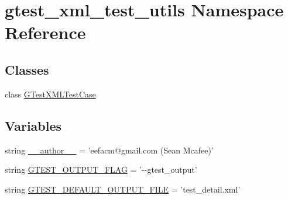 \hypertarget{namespacegtest__xml__test__utils}{\section{gtest\-\_\-xml\-\_\-test\-\_\-utils Namespace Reference}
\label{namespacegtest__xml__test__utils}
}
\subsection*{Classes}
\begin{DoxyCompactItemize}
\item 
class \hyperlink{classgtest__xml__test__utils_1_1_g_test_x_m_l_test_case}{G\-Test\-X\-M\-L\-Test\-Case}
\end{DoxyCompactItemize}
\subsection*{Variables}
\begin{DoxyCompactItemize}
\item 
string \hyperlink{namespacegtest__xml__test__utils_a75e1d6c9e5adaa9add821907994e1a40}{\-\_\-\-\_\-author\-\_\-\-\_\-} = 'eefacm@gmail.\-com (Sean Mcafee)'
\item 
string \hyperlink{namespacegtest__xml__test__utils_aa354c3ca453d90f496f4cbc576406fb2}{G\-T\-E\-S\-T\-\_\-\-O\-U\-T\-P\-U\-T\-\_\-\-F\-L\-A\-G} = '-\/-\/gtest\-\_\-output'
\item 
string \hyperlink{namespacegtest__xml__test__utils_aebe969ed368778716d0619214ff7b853}{G\-T\-E\-S\-T\-\_\-\-D\-E\-F\-A\-U\-L\-T\-\_\-\-O\-U\-T\-P\-U\-T\-\_\-\-F\-I\-L\-E} = 'test\-\_\-detail.\-xml'
\end{DoxyCompactItemize}


